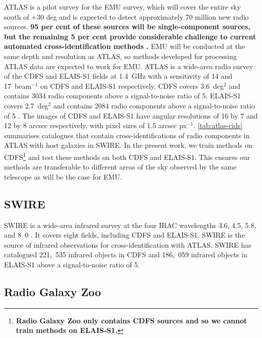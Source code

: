 \documentclass[fleqn,usenatbib,usedcolumn]{mnras}
\newcommand{\jansky}{\text{Jy}}
\newcommand{\edited}[1]{{\bf {#1}}}
\begin{document}
    ATLAS is a pilot survey for the EMU \citep{norris11} survey, which will
    cover the entire sky south of $+30$ deg and is expected to detect
    approximately 70 million new radio sources. \edited{95 per cent of these sources
    will be single-component sources, but the remaining 5 per cent provide
    considerable challenge to current automated cross-identification methods
    \citep{norris11}.} EMU will be conducted at the same depth and resolution
    as ATLAS, so methods developed for processing ATLAS data are expected to
    work for EMU. ATLAS is a wide-area radio survey of the CDFS and ELAIS-S1
    fields at 1.4~GHz with a sensitivity of 14 and
    \unit{17}{\micro\jansky}~beam$^{-1}$ on CDFS and ELAIS-S1 respectively.
    CDFS covers 3.6~deg$^2$ and contains 3034 radio components above a
    signal-to-noise ratio of 5. ELAIS-S1 covers 2.7~deg$^2$ and contains 2084
    radio components above a signal-to-noise ratio of 5 \citep{franzen15}. The
    images of CDFS and ELAIS-S1 have angular resolutions of 16 by 7 and 12 by
    8 arcsec respectively, with pixel sizes of 1.5 arcsec px$^{-1}$.
    \autoref{tab:atlas-cids} summarises catalogues that contain
    cross-identifications of radio components in ATLAS with host galaxies in
    SWIRE. In the present work, we train methods on
    CDFS\footnote{\edited{Radio Galaxy Zoo only contains CDFS sources and so
    we cannot train methods on ELAIS-S1.}} and test these methods on both CDFS
    and ELAIS-S1. This ensures our methods are transferable to different
    areas of the sky observed by the same telescope as will be the case for
    EMU.

  \subsection{SWIRE}\label{sec:swire}

    SWIRE \citep{lonsdale03swire, surace05swire} is a wide-area infrared
    survey at the four IRAC wavelengths 3.6, 4.5, 5.8, and
    \unit{8.0}{\micro\meter} \citep{lonsdale03swire}. It covers eight fields, including CDFS and ELAIS-S1. SWIRE is the source of infrared
    observations for cross-identification with ATLAS. SWIRE has catalogued 221,~535
    infrared objects in CDFS and 186,~059 infrared objects in ELAIS-S1 above a signal-to-noise ratio of 5.

  \subsection{Radio Galaxy Zoo}\label{sec:rgz}
\end{document}
